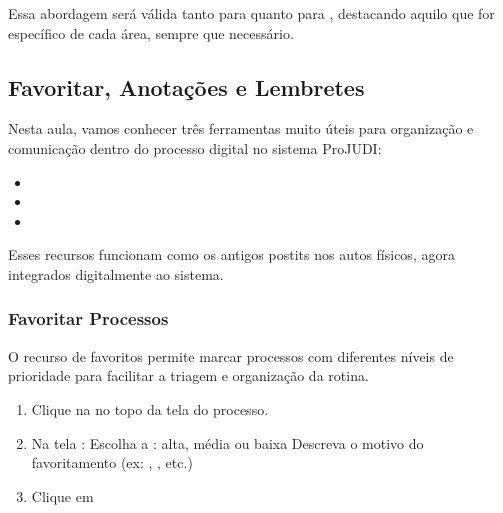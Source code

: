 \documentclass[letterpaper,10pt,brazil]{sphinxmanual}
\begin{document}
\sphinxAtStartPar
Essa abordagem será válida tanto para  quanto para , destacando aquilo que for específico de cada área, sempre que necessário.

\sphinxstepscope


\subsection{Favoritar, Anotações e Lembretes}
\label{\detokenize{projud_12_favoritar:favoritar-anotacoes-e-lembretes}}\label{\detokenize{projud_12_favoritar::doc}}
\sphinxAtStartPar
Nesta aula, vamos conhecer três ferramentas muito úteis para organização e comunicação dentro do processo digital no sistema ProJUDI:
\begin{itemize}
\item {} 
\sphinxAtStartPar
{}

\item {} 
\sphinxAtStartPar
{}

\item {} 
\sphinxAtStartPar
{}

\end{itemize}

\sphinxAtStartPar
Esses recursos funcionam como os antigos post\sphinxhyphen{}its nos autos físicos, agora integrados digitalmente ao sistema.


\subsubsection{Favoritar Processos}
\label{\detokenize{projud_12_favoritar:favoritar-processos}}
\sphinxAtStartPar
O recurso de favoritos permite marcar processos com diferentes níveis de prioridade para facilitar a triagem e organização da rotina.

\sphinxAtStartPar
{}
\begin{enumerate}
%
\item {} 
\sphinxAtStartPar
Clique na  no topo da tela do processo.

\item {} 
\sphinxAtStartPar
Na tela :
\sphinxhyphen{} Escolha a : alta, média ou baixa
\sphinxhyphen{} Descreva o motivo do favoritamento (ex: , , etc.)

\item {} 
\sphinxAtStartPar
Clique em 

\end{enumerate}
\end{document}
